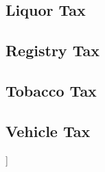 \documentclass[12pt]{article}
\begin{document}
\begin{appendices}
\subsection{Liquor Tax}
\subsection{Registry Tax}
\subsection{Tobacco Tax}
\subsection{Vehicle Tax}


\end{appendices}







\iffalse [[ SOMEONE: These tables need updating. ]]
\end{document}

